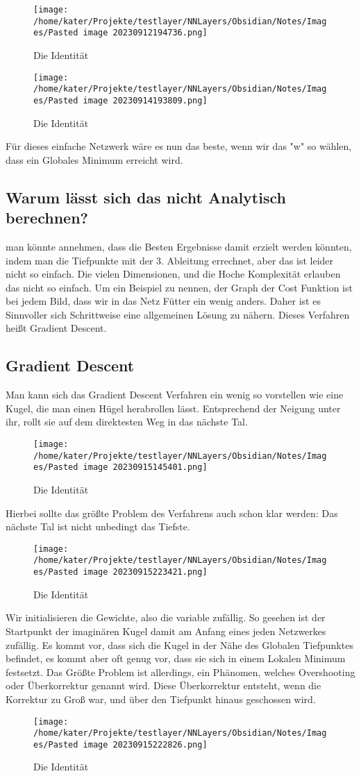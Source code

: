 \documentclass[12pt]{article}
\begin{document}
\begin{figure}[H]
\centering
\texttt{[image: /home/kater/Projekte/testlayer/NNLayers/Obsidian/Notes/Images/Pasted image 20230912194736.png]}
\caption{Die Identität}
\label{Was kommt hier rein?}\end{figure}\begin{figure}[H]
\centering
\texttt{[image: /home/kater/Projekte/testlayer/NNLayers/Obsidian/Notes/Images/Pasted image 20230914193809.png]}
\caption{Die Identität}
\label{Was kommt hier rein?}\end{figure}Für dieses einfache Netzwerk wäre es nun das beste, wenn wir das "w" so wählen, dass ein Globales Minimum erreicht wird. \subsection{ Warum lässt sich das nicht Analytisch berechnen?}man könnte annehmen, dass die Besten Ergebnisse damit erzielt werden könnten, indem man die Tiefpunkte mit der 3. Ableitung errechnet, aber das ist leider nicht so einfach.
Die vielen Dimensionen, und die Hoche Komplexität erlauben das nicht so einfach. Um ein Beispiel zu nennen, der Graph der Cost Funktion ist bei jedem Bild, dass wir in das Netz Fütter ein wenig anders. Daher ist es Sinnvoller sich Schrittweise eine allgemeinen Lösung zu nähern. Dieses Verfahren heißt Gradient Descent. \subsection{ Gradient Descent}Man kann sich das Gradient Descent Verfahren ein wenig so vorstellen wie eine Kugel, die man einen Hügel herabrollen lässt. Entsprechend der Neigung unter ihr, rollt sie auf dem direktesten Weg in das nächste Tal. 
\begin{figure}[H]
\centering
\texttt{[image: /home/kater/Projekte/testlayer/NNLayers/Obsidian/Notes/Images/Pasted image 20230915145401.png]}
\caption{Die Identität}
\label{Was kommt hier rein?}\end{figure}
Hierbei sollte das größte Problem des Verfahrens auch schon klar werden: Das nächste Tal ist nicht unbedingt das Tiefste.
\begin{figure}[H]
\centering
\texttt{[image: /home/kater/Projekte/testlayer/NNLayers/Obsidian/Notes/Images/Pasted image 20230915223421.png]}
\caption{Die Identität}
\label{Was kommt hier rein?}\end{figure}Wir initialisieren die Gewichte, also die variable zufällig. So gesehen ist der Startpunkt der imaginären Kugel damit am Anfang eines jeden Netzwerkes zufällig. Es kommt vor, dass sich die Kugel in der Nähe des Globalen Tiefpunktes befindet, es kommt aber oft genug vor, dass sie sich in einem Lokalen Minimum festsetzt. 
Das Größte Problem ist allerdings, ein Phänomen, welches Overshooting oder Überkorrektur genannt wird. Diese Überkorrektur entsteht, wenn die Korrektur zu Groß war, und über den Tiefpunkt hinaus geschossen wird.
\begin{figure}[H]
\centering
\texttt{[image: /home/kater/Projekte/testlayer/NNLayers/Obsidian/Notes/Images/Pasted image 20230915222826.png]}
\caption{Die Identität}
\label{Was kommt hier rein?}\end{figure}
\end{document}
